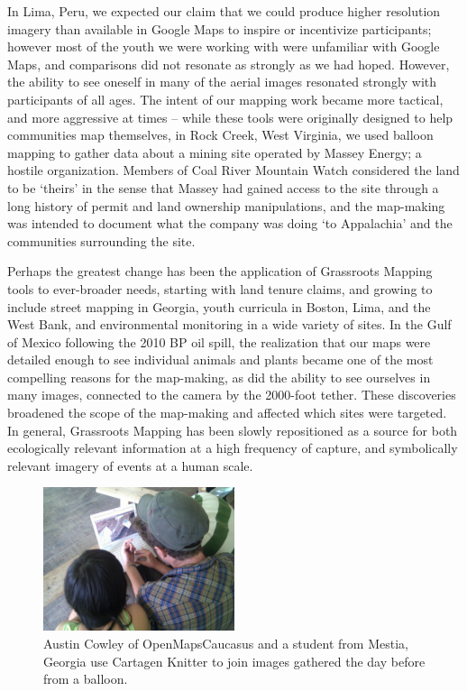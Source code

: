 \documentclass[11pt]{report}
\begin{document}
In Lima, Peru, we expected our claim that we could produce higher resolution imagery than available in Google Maps to inspire or incentivize participants; however most of the youth we were working with were unfamiliar with Google Maps, and comparisons did not resonate as strongly as we had hoped. However, the ability to see oneself in many of the aerial images resonated strongly with participants of all ages. The intent of our mapping work became more tactical, and more aggressive at times -- while these tools were originally designed to help communities map themselves, in Rock Creek, West Virginia, we used balloon mapping to gather data about a mining site operated by Massey Energy; a hostile organization. Members of Coal River Mountain Watch considered the land to be `theirs' in the sense that Massey had gained access to the site through a long history of permit and land ownership manipulations, and the map-making was intended to document what the company was doing `to Appalachia' and the communities surrounding the site.

Perhaps the greatest change has been the application of Grassroots Mapping tools to ever-broader needs, starting with land tenure claims, and growing to include street mapping in Georgia, youth curricula in Boston, Lima, and the West Bank, and environmental monitoring in a wide variety of sites. In the Gulf of Mexico following the 2010 BP oil spill, the realization that our maps were detailed enough to see individual animals and plants became one of the most compelling reasons for the map-making, as did the ability to see ourselves in many images, connected to the camera by the 2000-foot tether. These discoveries broadened the scope of the map-making and affected which sites were targeted. In general, Grassroots Mapping has been slowly repositioned as a source for both ecologically relevant information at a high frequency of capture, and symbolically relevant imagery of events at a human scale.

\begin{figure}
  \begin{flushleft}
	\includegraphics[width=0.5\textwidth]{images/knitter-mestia.jpg} 
	\caption{Austin Cowley of OpenMapsCaucasus and a student from Mestia, Georgia use Cartagen Knitter to join images gathered the day before from a balloon.}
  \end{flushleft}
\end{figure}
\end{document}
